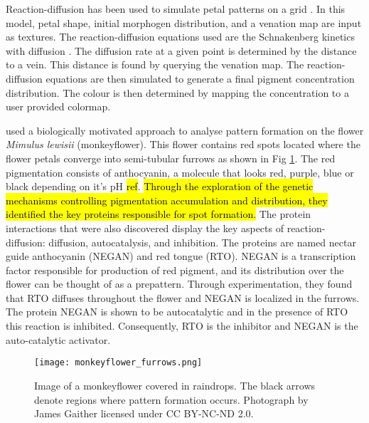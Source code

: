 Reaction-diffusion has been used to simulate petal patterns on a grid \cite{Zhou2007}. In this model, petal shape, initial morphogen distribution, and a venation map are input as textures. The reaction-diffusion equations used are the Schnakenberg kinetics with diffusion \cite{schnakenberg1979}. The diffusion rate at a given point is determined by the distance to a vein. This distance is found by querying the venation map. The reaction-diffusion equations are then simulated to generate a final pigment concentration distribution. The colour is then determined by mapping the concentration to a user provided colormap.

\cite{Ding2018} used a biologically motivated approach to analyse pattern formation on the flower \textit{Mimulus lewisii} (monkeyflower). This flower contains red spots located where the flower petals converge into semi-tubular furrows as shown in Fig \ref{fig:monkeyflower_real}. The red pigmentation consists of anthocyanin, a molecule that looks red, purple, blue or black depending on it's pH \hl{ref}. \hl{Through the exploration of the genetic mechanisms controlling pigmentation accumulation and distribution, they identified the key proteins responsible for spot formation.} The protein interactions that were also discovered display the key aspects of reaction-diffusion: diffusion, autocatalysis, and inhibition. The proteins are named nectar guide anthocyanin (NEGAN) and red tongue (RTO). NEGAN is a transcription factor responsible for production of red pigment, and its distribution over the flower can be thought of as a prepattern. Through experimentation, they found that RTO diffuses throughout the flower and NEGAN is localized in the furrows. The protein NEGAN is shown to be autocatalytic and in the presence of RTO this reaction is inhibited. Consequently, RTO is the inhibitor and NEGAN is the auto-catalytic activator.

\begin{figure}[ht]
	\centering
	\texttt{[image: monkeyflower\_furrows.png]}
	\caption{Image of a monkeyflower covered in raindrops. The black arrows denote regions where pattern formation occurs. Photograph by James Gaither licensed under CC BY-NC-ND 2.0.}
	\label{fig:monkeyflower_real}
\end{figure}

